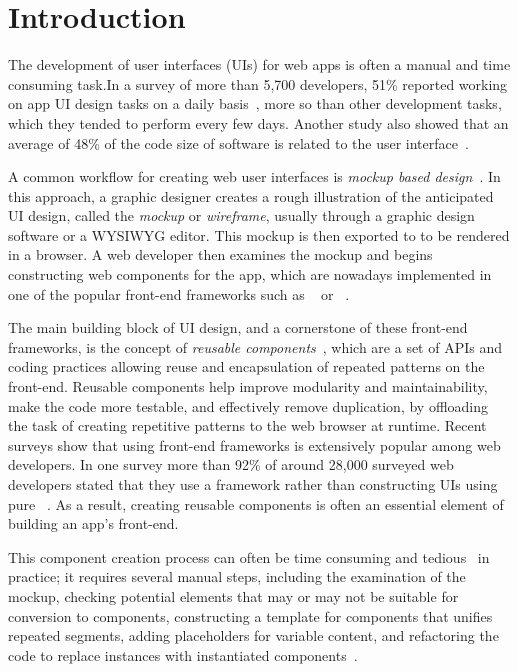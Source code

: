 
\section{Introduction}
\label{section:introduction}

The development of user interfaces (UIs) for web apps is often a manual and time 
consuming task.In a survey of more than 5,700 developers, 51\% reported working 
on app UI design tasks on a daily basis~\cite{IDC:survey},
more so than other development tasks, which they tended to perform every few days. 
Another study also showed that an average of 48\% of the code size of software is 
related to the user interface~\cite{myers:ui:survey}.

A common workflow for creating web user interfaces 
is \textit{mockup based design}~\cite{Newman:2000:SitemapsStoryboardsSpecifications, Ozenc:2010:SupportDesigners}.
In this approach, a graphic designer creates a rough illustration of the anticipated UI design, called the \textit{mockup} or \textit{wireframe},
usually through a graphic design software or a WYSIWYG editor. 
This mockup is then exported to \html to be rendered in a browser.
A web developer then examines the mockup and begins constructing web components for the app, which are nowadays implemented in one of the popular front-end frameworks such as \angular~\cite{Angular} or \react~\cite{React}.

\renewcommand{\toolname}{\textsc{VizMod}\xspace}
The main building block of UI design, and a cornerstone of these front-end frameworks, is the concept of  
\textit{reusable components}~\cite{React-components, Angular-components},
which are a set of APIs and coding practices allowing reuse and encapsulation of repeated patterns on the front-end.
Reusable components help improve modularity and maintainability, make the code more testable, and effectively remove duplication,
by offloading the task of creating repetitive patterns to the web browser at runtime. 
Recent surveys show that using front-end frameworks is extensively popular among web developers. In one survey more than 92\% of around 28,000 surveyed web developers stated that they use a framework 
rather than constructing UIs using pure \html~\cite{StateOfJS:WebPlatformTests}.
As a result, creating reusable components is often an essential element of building an app's front-end.

This component creation process can often be time consuming and tedious~\cite{thinking:in:components} in practice;  
 it requires several manual steps,
including the examination of the mockup, 
checking potential elements that may or may not be suitable for conversion to components, 
constructing a template for components that unifies repeated segments, 
adding placeholders for variable content, and
refactoring the code to replace instances with instantiated components~\cite{thinking:in:components}.

